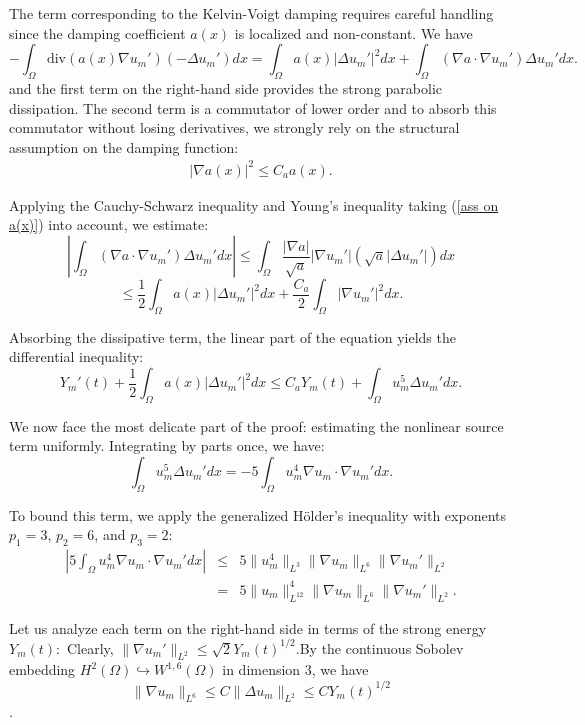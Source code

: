 \documentclass[11pt,letterpaper]{amsart}
\begin{document}
The term corresponding to the Kelvin-Voigt damping requires careful handling since the damping coefficient $a(x)$ is localized and non-constant. We have
$$- \int_\Omega \text{div}(a(x)\nabla u_m')(-\Delta u_m') dx = \int_\Omega a(x)|\Delta u_m'|^2 dx + \int_\Omega (\nabla a \cdot \nabla u_m')\Delta u_m' dx.$$
and the first term on the right-hand side provides the strong parabolic dissipation. The second term is a commutator of lower order and to absorb this commutator without losing derivatives, we strongly rely on the structural assumption on the damping function:
\begin{eqnarray}\label{ass on a(x)}
|\nabla a(x)|^2 \le C_a a(x).
\end{eqnarray}

Applying the Cauchy-Schwarz inequality and Young's inequality taking (\ref{ass on a(x)}) into account, we estimate:
$$\left| \int_\Omega (\nabla a \cdot \nabla u_m')\Delta u_m' dx \right| \le \int_\Omega \frac{|\nabla a|}{\sqrt{a}} |\nabla u_m'| \left(\sqrt{a} |\Delta u_m'|\right) dx $$
$$\le \frac{1}{2} \int_\Omega a(x) |\Delta u_m'|^2 dx + \frac{C_a}{2} \int_\Omega |\nabla u_m'|^2 dx.$$

Absorbing the dissipative term, the linear part of the equation yields the differential inequality:
$$Y_m'(t) + \frac{1}{2} \int_\Omega a(x) |\Delta u_m'|^2 dx \le C_a Y_m(t) + \int_\Omega u_m^5 \Delta u_m' dx.$$


We now face the most delicate part of the proof: estimating the nonlinear source term uniformly. Integrating by parts once, we have:
$$\int_\Omega u_m^5 \Delta u_m' dx = -5 \int_\Omega u_m^4 \nabla u_m \cdot \nabla u_m' dx.$$

To bound this term, we apply the generalized Hölder's inequality with exponents $p_1 = 3$, $p_2 = 6$, and $p_3 = 2$:
\begin{eqnarray*}
\left| 5 \int_\Omega u_m^4 \nabla u_m \cdot \nabla u_m' dx \right| &\le& 5 \|u_m^4\|_{L^3} \|\nabla u_m\|_{L^6} \|\nabla u_m'\|_{L^2}\\
 &=& 5 \|u_m\|_{L^{12}}^4 \|\nabla u_m\|_{L^6} \|\nabla u_m'\|_{L^2}.
 \end{eqnarray*}

Let us analyze each term on the right-hand side in terms of the strong energy $Y_m(t)$:~Clearly, $\|\nabla u_m'\|_{L^2} \le \sqrt{2} Y_m(t)^{1/2}$.By the continuous Sobolev embedding $H^2(\Omega) \hookrightarrow W^{1,6}(\Omega)$ in dimension 3, we have $$\|\nabla u_m\|_{L^6} \le C \|\Delta u_m\|_{L^2} \le C Y_m(t)^{1/2}$$.
\end{document}
